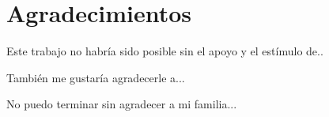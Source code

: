 \chapter*{Agradecimientos}

Este trabajo no habría sido posible sin el apoyo y el estímulo de..

También me gustaría agradecerle a...

No puedo terminar sin agradecer a mi familia...